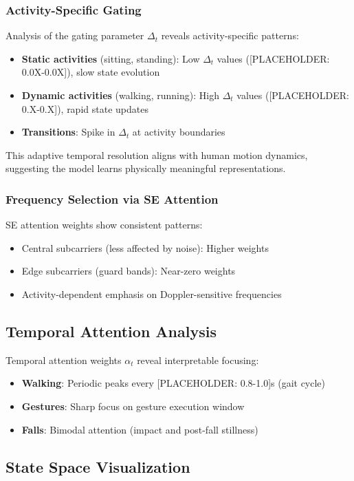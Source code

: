 \documentclass[journal]{IEEEtran}
\begin{document}
\subsubsection{Activity-Specific Gating}
Analysis of the gating parameter $\Delta_t$ reveals activity-specific patterns:
\begin{itemize}
\item \textbf{Static activities} (sitting, standing): Low $\Delta_t$ values ([PLACEHOLDER: 0.0X-0.0X]), slow state evolution
\item \textbf{Dynamic activities} (walking, running): High $\Delta_t$ values ([PLACEHOLDER: 0.X-0.X]), rapid state updates
\item \textbf{Transitions}: Spike in $\Delta_t$ at activity boundaries
\end{itemize}

This adaptive temporal resolution aligns with human motion dynamics, suggesting the model learns physically meaningful representations.

\subsubsection{Frequency Selection via SE Attention}
SE attention weights show consistent patterns:
\begin{itemize}
\item Central subcarriers (less affected by noise): Higher weights
\item Edge subcarriers (guard bands): Near-zero weights
\item Activity-dependent emphasis on Doppler-sensitive frequencies
\end{itemize}

\subsection{Temporal Attention Analysis}

Temporal attention weights $\alpha_t$ reveal interpretable focusing:
\begin{itemize}
\item \textbf{Walking}: Periodic peaks every [PLACEHOLDER: 0.8-1.0]s (gait cycle)
\item \textbf{Gestures}: Sharp focus on gesture execution window
\item \textbf{Falls}: Bimodal attention (impact and post-fall stillness)
\end{itemize}

\subsection{State Space Visualization}
\end{document}
